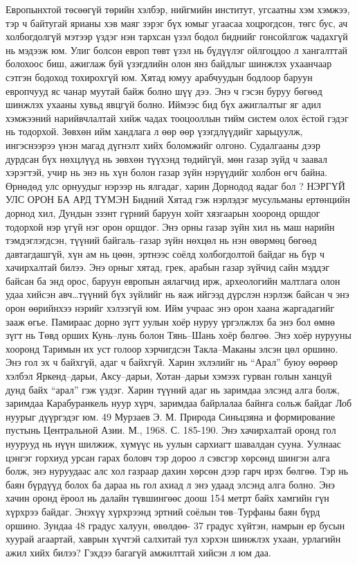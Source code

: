 Европынхтой төсөөгүй төрийн хэлбэр, нийгмийн институт, угсаатны хэм хэмжээ, тэр ч байтугай ярианы хэв маяг зэрэг бүх юмыг угаасаа хоцрогдсон, төгс бус, ач холбогдолгүй мэтээр үздэг нэн тархсан үзэл бодол биднийг гонсойлгож чадахгүй нь мэдээж юм. Улиг болсон европ төвт үзэл нь бүдүүлэг ойлгоцдоо л хангалттай болохоос биш, ажиглаж буй үзэгдлийн олон янз байдлыг шинжлэх ухаанчаар сэтгэн бодоход тохирохгүй юм. Хятад юмуу арабчуудын бодлоор баруун европчууд яс чанар муутай байж болно шүү дээ. Энэ ч гэсэн буруу бөгөөд шинжлэх ухааны хувьд явцгүй болно. Иймээс бид бүх ажиглалтыг яг адил хэмжээний нарийвчлалтай хийж чадах тооцооллын тийм систем олох ёстой гэдэг нь тодорхой. Зөвхөн ийм хандлага л өөр өөр үзэгдлүүдийг харьцуулж, ингэснээрээ үнэн магад дүгнэлт хийх боломжийг олгоно. Судалгааны дээр дурдсан бүх нөхцлүүд нь зөвхөн түүхэнд төдийгүй, мөн газар зүйд ч заавал хэрэгтэй, учир нь энэ нь хүн болон газар зүйн нэрүүдийг холбон өгч байна. Өрнөдөд улс орнуудыг нэрээр нь ялгадаг, харин Дорнодод яадаг бол ?
НЭРГҮЙ УЛС ОРОН БА АРД ТҮМЭН
Бидний Хятад гэж нэрлэдэг мусульманы ертөнцийн дорнод хил, Дундын эзэнт гүрний баруун хойт хязгаарын хооронд оршдог тодорхой нэр үгүй нэг орон оршдог. Энэ орны газар зүйн хил нь маш нарийн тэмдэглэгдсэн, түүний байгаль–газар зүйн нөхцөл нь нэн өвөрмөц бөгөөд давтагдашгүй, хүн ам нь цөөн, эртнээс соёлд холбогдолтой байдаг нь бүр ч хачирхалтай билээ. Энэ орныг хятад, грек, арабын газар зүйчид сайн мэддэг байсан ба энд орос, баруун европын аялагчид ирж, археологийн малтлага олон удаа хийсэн авч…түүний бүх зүйлийг нь яаж ийгээд дүрслэн нэрлэж байсан ч энэ орон өөрийнхээ нэрийг хэлээгүй юм. Ийм учраас энэ орон хаана жаргадагийг зааж өгье.
Памираас дорно зүгт уулын хоёр нуруу үргэлжлэх ба энэ бол өмнө зүгт нь Төвд орших Кунь–лунь болон Тянь–Шань хоёр бөлгөө. Энэ хоёр нурууны хооронд Таримын их уст голоор хэрчигдсэн Такла–Маканы элсэн цөл оршино. Энэ гол эх ч байхгүй, адаг ч байхгүй. Харин эхлэлийг нь “Арал” буюу өөрөөр хэлбэл Яркенд–дарьи, Аксу–дарьи, Хотан–дарьи хэмээх гурван голын ханцуй дунд байх “арал” гэж үздэг. Харин түүний адаг нь заримдаа элсэнд алга болж, заримдаа Карабуранкель нуур хүрч, заримдаа байрлалаа байнга сольж байдаг Лоб нуурыг дүүргэдэг юм.
49 Мурзаев Э. М. Природа Синьцзяна и формирование пустынь Центральной Азии. М., 1968. С. 185-190.
Энэ хачирхалтай оронд гол нуурууд нь нүүн шилжиж, хүмүүс нь уулын сархиагт шавалдан сууна. Уулнаас цэнгэг горхиуд урсан гарах боловч тэр дороо л сэвсгэр хөрсөнд шингэн алга болж, энэ нуруудаас алс хол газраар дахин хөрсөн дээр гарч ирэх бөлгөө. Тэр нь баян бүрдүүд болох ба дараа нь гол ахиад л энэ удаад элсэнд алга болно. Энэ хачин оронд ёроол нь далайн түвшингөөс доош 154 метрт байх хамгийн гүн хүрхрээ байдаг. Энэхүү хүрхрээнд эртний соёлын төв–Турфаны баян бүрд оршино. Зундаа 48 градус халуун, өвөлдөө- 37 градус хүйтэн, намрын ер бусын хуурай агаартай, хаврын хүчтэй салхитай тул хэрхэн шинжлэх ухаан, урлагийн ажил хийх билээ? Гэхдээ багагүй амжилттай хийсэн л юм даа.
